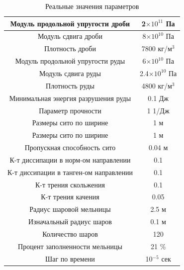 \documentclass[c]{beamer}  %
\begin{document}
\begin{frame}

\begin{table}[H]
\caption{Реальные значения параметров}
\begin{tabular}{|c|c|}
\hline
Модуль продольной упругости дроби & 2$\times 10^{11}$ Па  \\ 
\hline
Модуль сдвига дроби & 8$\times 10^{10}$ Па \\  
\hline
Плотность дроби & 7800 кг/м$^3$ \\
\hline
Модуль продольной упругости руды & 6$\times 10^{10}$ Па  \\ 
\hline
Модуль сдвига руды & 2.4$\times 10^{10}$ Па \\  
\hline
Плотность руды & 4800 кг/м$^3$ \\
\hline
Минимальная энергия разрушения руды & 0.1 Дж \\
\hline
Параметр прочности & 1 1/Дж \\
\hline
Размеры сито по ширине & 1 м \\
\hline
Размеры сито по ширине & 1 м \\
\hline
Пропускная способность сито & 0.04 м \\
\hline
К-т диссипации в норм-ом направлении & 0.1 \\
\hline
К-т диссипации в танген-ом направлении & 0.1 \\
\hline
К-т трения скольжения & 0.1 \\
\hline
К-т трения качения & 0.05 \\
\hline
Радиус шаровой мельницы & 2.5 м \\
\hline
Изначальный радиус шаров & 0.1 м \\
\hline
Количество шаров & 120 \\
\hline
Процент заполненности мельницы & 21 \% \\
\hline
Шаг по времени & 10$^{-5}$ сек \\
\hline
\end{tabular}
\end{table}
\end{frame}
\end{document}
